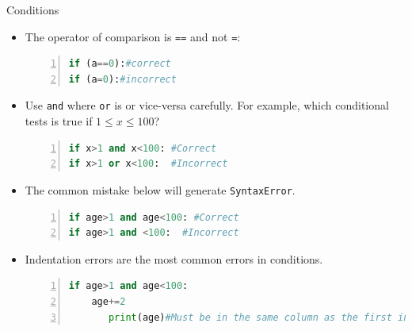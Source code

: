\begin{frame}[fragile]{Conditions}
\begin{itemize}[<+->]
\item The operator of comparison is \texttt{==} and not \texttt{=}:
    \begin{lstlisting}[numbers=left,showstringspaces=false,language=python]
if (a==0):#correct
if (a=0):#incorrect
\end{lstlisting}
\item Use \texttt{and} where \texttt{or} is or vice-versa carefully. For example, which conditional tests is true if $1 \leq x \leq 100$?

\begin{lstlisting}[numbers=left,showstringspaces=false,language=python]
if x>1 and x<100: #Correct 
if x>1 or x<100:  #Incorrect 
\end{lstlisting}
\item The common mistake below will generate \texttt{SyntaxError}.
\begin{lstlisting}[numbers=left,showstringspaces=false,language=python]
if age>1 and age<100: #Correct 
if age>1 and <100:  #Incorrect 
\end{lstlisting}
\item Indentation errors are the most common errors in conditions.
\begin{lstlisting}[numbers=left,showstringspaces=false,language=python]
if age>1 and age<100: 
    age+=2
       print(age)#Must be in the same column as the first instruction
\end{lstlisting}
\end{itemize}
\end{frame}


